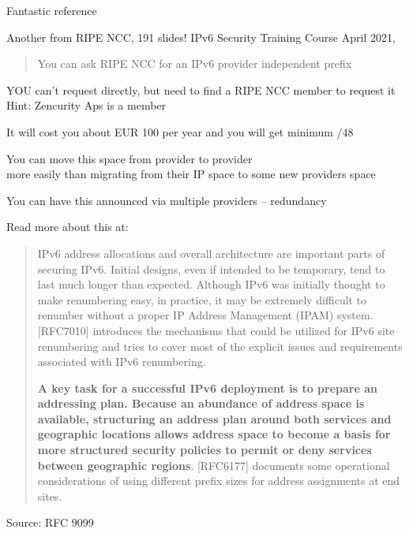 \documentclass[Screen16to9,17pt]{foils}
\begin{document}
\begin{list2}
\item Fantastic reference
\item Another from RIPE NCC, 191 slides! IPv6 Security Training Course April 2021,\\
\end{list2}




\begin{quote}
You can ask RIPE NCC for an IPv6 provider independent prefix
\end{quote}

\begin{list2}
\item YOU can't request directly, but need to find a RIPE NCC member to request it\\
Hint: Zencurity Aps is a member
\item It will cost you about EUR 100 per year and you will get minimum /48
\item You can move this space from provider to provider\\
more easily than migrating from their IP space to some new providers space
\item You can have this announced via multiple providers -- redundancy
\item Read more about this at:\\
\end{list2}





\begin{quote}
IPv6 address allocations and overall architecture are important parts
of securing IPv6.  Initial designs, even if intended to be temporary,
tend to last much longer than expected.  Although IPv6 was initially
thought to make renumbering easy, in practice, it may be extremely
difficult to renumber without a proper IP Address Management (IPAM)
system.  [RFC7010] introduces the mechanisms that could be utilized
for IPv6 site renumbering and tries to cover most of the explicit
issues and requirements associated with IPv6 renumbering.

{\bf A key task for a successful IPv6 deployment is to prepare an
addressing plan.  Because an abundance of address space is available,
structuring an address plan around both services and geographic
locations allows address space to become a basis for more structured
security policies to permit or deny services between geographic
regions}.  [RFC6177] documents some operational considerations of
using different prefix sizes for address assignments at end sites.
\end{quote}
Source: RFC 9099
\end{document}
